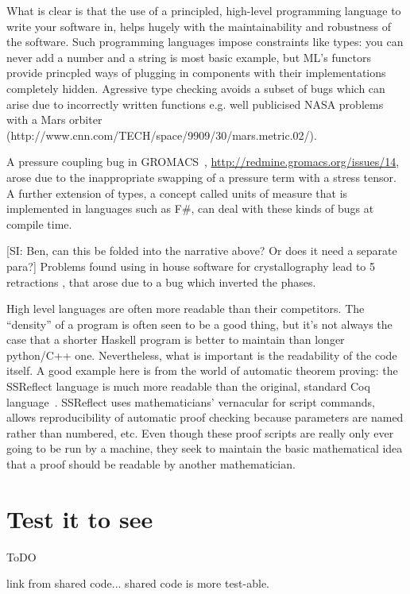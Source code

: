 \documentclass[conference]{IEEEtran}
\begin{document}
What is clear is that the use of a principled, high-level programming
language to write your software in, helps hugely with the
maintainability and robustness of the software. Such programming
languages impose constraints like types: you can never add a number
and a string is most basic example, but ML's functors provide
princpled ways of plugging in components with their implementations
completely hidden. Agressive type checking avoids a subset of bugs
which can arise due to incorrectly written functions e.g. well
publicised NASA problems with a Mars orbiter
(http://www.cnn.com/TECH/space/9909/30/mars.metric.02/).

A pressure coupling bug in GROMACS~\cite{Hess2008},
\url{http://redmine.gromacs.org/issues/14}, arose due to the
inappropriate swapping of a pressure term with a stress tensor.  A
further extension of types, a concept called units of measure that is
implemented in languages such as F\#, can deal with these kinds of
bugs at compile time.

[SI: Ben, can this be folded into the narrative above? Or does it need a separate para?]
Problems found using in house software for crystallography lead to 5
retractions \cite{Miller2006}, that arose due to a bug which inverted
the phases.

High level languages are often more readable than their
competitors. The ``density'' of a program is often seen to be a good
thing, but it's not always the case that a shorter Haskell program is
better to maintain than longer python/C++ one. Nevertheless, what is
important is the readability of the code itself. A good example here
is from the world of automatic theorem proving: the SSReflect language
is much more readable than the original, standard Coq
language~\cite{GonthierZND13}. SSReflect uses mathematicians'
vernacular for script commands, allows reproducibility of automatic
proof checking because parameters are named rather than numbered,
etc. Even though these proof scripts are really only ever going to be
run by a machine, they seek to maintain the basic mathematical idea
that a proof should be readable by another mathematician.



\section{Test it to see}

ToDO 

link from shared code... shared code is more test-able. 
\end{document}
